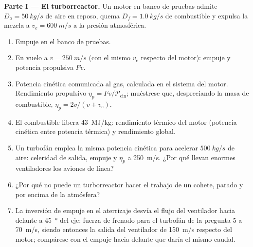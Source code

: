 \begin{problem}
\label{pb:b2:flow-balances:1}

\medskip
\noindent\textbf{Parte I --- El turborreactor.}
Un motor en banco de pruebas admite $D_a = \qty{50}{kg/s}$ de aire en
reposo, quema $D_f = \qty{1.0}{kg/s}$ de combustible y expulsa la mezcla a $v_e =
\qty{600}{m/s}$ a la presión atmosférica.
\begin{enumerate}
  \item Empuje en el banco de pruebas.
  \item En vuelo a $v = \qty{250}{m/s}$ (con el mismo $v_e$ respecto del
        motor): empuje y potencia propulsiva $Fv$.
  \item Potencia cinética comunicada al gas, calculada en el sistema del
        motor. Rendimiento propulsivo $\eta_p = Fv/\mathcal P_{\text{cin}}$;
        muéstrese que, despreciando la masa de combustible,
        $\eta_p = 2v/(v + v_e)$.
  \item El combustible libera \qty{43}{MJ/kg}: rendimiento térmico del
        motor (potencia cinética entre potencia térmica) y rendimiento
        global.
  \item Un turbofán emplea la misma potencia cinética para acelerar
        $\qty{500}{kg/s}$ de aire: celeridad de salida, empuje y $\eta_p$ a
        \qty{250}{m/s}. ¿Por qué llevan enormes ventiladores los aviones de
        línea?
  \item ¿Por qué no puede un turborreactor hacer el trabajo de un cohete,
        parado y por encima de la atmósfera?
  \item La inversión de empuje en el aterrizaje desvía el flujo del
        ventilador hacia delante a \qty{45}{\degree} del eje: fuerza de
        frenado para el turbofán de la pregunta 5 a \qty{70}{m/s}, siendo
        entonces la salida del ventilador de \qty{150}{m/s} respecto del
        motor; compárese con el empuje hacia delante que daría el mismo
        caudal.
\end{enumerate}


\end{problem}
